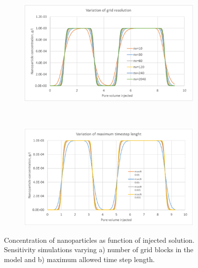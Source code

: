 \begin{figure}[h] %
    \begin{subfigure}{\textwidth}
    \centering
    \includegraphics[width=\textwidth]{img/cht/simNPa.png}
    \caption{}
    \label{cht:simNPa}
    \end{subfigure}
    \\
    \begin{subfigure}{\textwidth}
    \centering
    \includegraphics[width=\textwidth]{img/cht/simNPb.png}
    \caption{}
    \label{cht:simNPb}
    \end{subfigure}
    
    \caption{Concentration of nanoparticles as function of injected solution. Sensitivity simulations varying a) number of grid blocks in the model and b) maximum allowed time step length.}
    \label{cht:simNP}
\end{figure}

